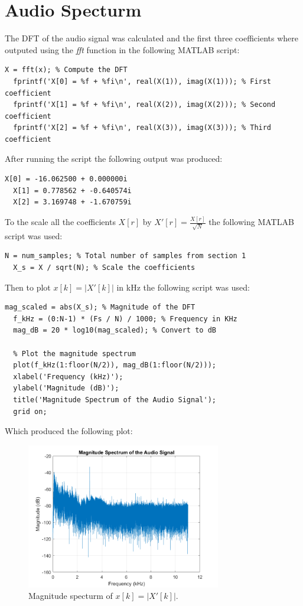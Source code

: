 \documentclass[a4paper, 10pt]{article}
\begin{document}
\section{Audio Specturm}
The DFT of the audio signal was calculated and the first three coefficients where outputed using
the \textit{fft} function in the following MATLAB script:
\begin{lstlisting}[style=Matlab-editor, basicstyle=\small\ttfamily]
  X = fft(x); % Compute the DFT
  fprintf('X[0] = %f + %fi\n', real(X(1)), imag(X(1))); % First coefficient
  fprintf('X[1] = %f + %fi\n', real(X(2)), imag(X(2))); % Second coefficient
  fprintf('X[2] = %f + %fi\n', real(X(3)), imag(X(3))); % Third coefficient
\end{lstlisting}
After running the script the following output was produced:
\begin{lstlisting}[basicstyle=\small\ttfamily]
  X[0] = -16.062500 + 0.000000i
  X[1] = 0.778562 + -0.640574i
  X[2] = 3.169748 + -1.670759i
\end{lstlisting}
\noindent To the scale all the coefficients $X[r]$ by $X'[r] = \frac{X[r]}{\sqrt{N}}$ the following
MATLAB script was used:
\begin{lstlisting}[style=Matlab-editor, basicstyle=\small\ttfamily]  
  N = num_samples; % Total number of samples from section 1
  X_s = X / sqrt(N); % Scale the coefficients
\end{lstlisting}
Then to plot $x[k] = |X'[k]|$ in kHz the following script was used:
\begin{lstlisting}[style=Matlab-editor, basicstyle=\small\ttfamily]
  mag_scaled = abs(X_s); % Magnitude of the DFT
  f_kHz = (0:N-1) * (Fs / N) / 1000; % Frequency in KHz
  mag_dB = 20 * log10(mag_scaled); % Convert to dB
  
  % Plot the magnitude spectrum
  plot(f_kHz(1:floor(N/2)), mag_dB(1:floor(N/2)));
  xlabel('Frequency (kHz)');
  ylabel('Magnitude (dB)');
  title('Magnitude Spectrum of the Audio Signal');
  grid on;
\end{lstlisting}
Which produced the following plot:
\begin{figure}[H]
  \centering
  \includegraphics[width=8.5cm]{images/q2d.png}
  \caption{Magnitude specturm of $x[k] = |X'[k]|$.}
\end{figure}
\end{document}
